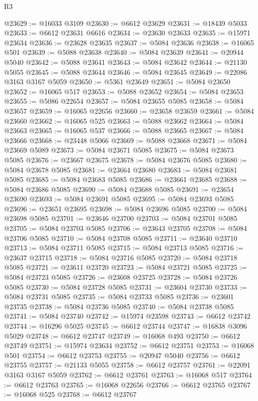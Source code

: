 \begin{lexlean}{R3}
\begin{coremodule}
@23629 := @16033 @3109
@23630 := @6612 @23629
@23631 := @18439 @5033
@23633 := @6612 @23631 @6616
@23634 := @23630 @23633
@23635 := @15971 @23634
@23636 := @23628 @23635
@23637 := @5084 @23636
@23638 := @16065 @501
@23639 := @5088 @23638
@23640 := @5084 @23639
@23641 := @20944 @5040
@23642 := @5088 @23641
@23643 := @5084 @23642
@23644 := @21130 @5055
@23645 := @5088 @23644
@23646 := @5084 @23645
@23649 := @22086 @3163 @3167 @5059
@23650 := @5361 @23649
@23651 := @5084 @23650
@23652 := @16065 @517
@23653 := @5088 @23652
@23654 := @5084 @23653
@23655 := @5086 @22654
@23657 := @5084 @23655 @5085
@23658 := @5084 @23657
@23659 := @16065 @22656
@23660 := @23658 @23659
@23661 := @5084 @23660
@23662 := @16065 @525
@23663 := @5088 @23662
@23664 := @5084 @23663
@23665 := @16065 @537
@23666 := @5088 @23665
@23667 := @5084 @23666
@23668 := @23448 @5066
@23669 := @5088 @23668
@23671 := @5084 @23669 @5089
@23673 := @5084 @23671 @5085
@23675 := @5084 @23673 @5085
@23676 := @23667 @23675
@23678 := @5084 @23676 @5085
@23680 := @5084 @23678 @5085
@23681 := @23664 @23680
@23683 := @5084 @23681 @5085
@23685 := @5084 @23683 @5085
@23686 := @23661 @23685
@23688 := @5084 @23686 @5085
@23690 := @5084 @23688 @5085
@23691 := @23654 @23690
@23693 := @5084 @23691 @5085
@23695 := @5084 @23693 @5085
@23696 := @23651 @23695
@23698 := @5084 @23696 @5085
@23700 := @5084 @23698 @5085
@23701 := @23646 @23700
@23703 := @5084 @23701 @5085
@23705 := @5084 @23703 @5085
@23706 := @23643 @23705
@23708 := @5084 @23706 @5085
@23710 := @5084 @23708 @5085
@23711 := @23640 @23710
@23713 := @5084 @23711 @5085
@23715 := @5084 @23713 @5085
@23716 := @23637 @23715
@23718 := @5084 @23716 @5085
@23720 := @5084 @23718 @5085
@23721 := @23611 @23720
@23723 := @5084 @23721 @5085
@23725 := @5084 @23723 @5085
@23726 := @23608 @23725
@23728 := @5084 @23726 @5085
@23730 := @5084 @23728 @5085
@23731 := @23604 @23730
@23733 := @5084 @23731 @5085
@23735 := @5084 @23733 @5085
@23736 := @23601 @23735
@23738 := @5084 @23736 @5085
@23740 := @5084 @23738 @5085
@23741 := @5084 @23740
@23742 := @15974 @23598
@23743 := @6612 @23742
@23744 := @16296 @5025
@23745 := @6612 @23744
@23747 := @16838 @3096 @5029
@23748 := @6612 @23747
@23749 := @16068 @493
@23750 := @6612 @23749
@23751 := @15974 @23634
@23752 := @6612 @23751
@23753 := @16068 @501
@23754 := @6612 @23753
@23755 := @20947 @5040
@23756 := @6612 @23755
@23757 := @21133 @5055
@23758 := @6612 @23757
@23761 := @22091 @3163 @3167 @5059
@23762 := @6612 @23761
@23763 := @16068 @517
@23764 := @6612 @23763
@23765 := @16068 @22656
@23766 := @6612 @23765
@23767 := @16068 @525
@23768 := @6612 @23767

\end{coremodule}
\end{lexlean}
